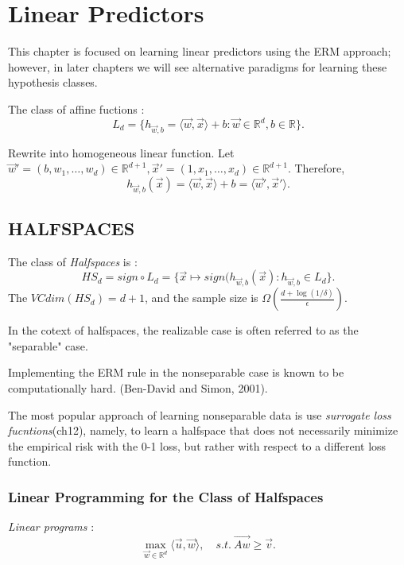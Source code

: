
\section{Linear Predictors}

This chapter is focused on learning linear predictors using the ERM approach; however,
in later chapters we will see alternative paradigms for learning these hypothesis classes.

The class of affine fuctions :
\[
	L_d = \{ h_{\vec{w},b} = \langle \vec{w},\vec{x} \rangle + b
	: \vec{w}\in\mathbb{R}^d, b\in\mathbb{R}\}
.\]

Rewrite into homogeneous linear function.
Let $\vec{w}' = (b, w_1, \dots, w_d) \in \mathbb{R}^{d+1}, 
\vec{x}' = (1, x_1, \dots, x_d) \in \mathbb{R}^{d+1}$. Therefore,
\[
	h_{\vec{w},b}(\vec{x}) = \langle \vec{w},\vec{x}\rangle + b
	= \langle \vec{w}', \vec{x}' \rangle
.\]


\subsection{HALFSPACES}

The class of \emph{Halfspaces} is :
\[
	HS_d = sign \circ L_d = \{ \vec{x}\mapsto sign(h_{\vec{w},b}(\vec{x}) :
	h_{\vec{w},b} \in L_d \}
.\]
The $VCdim(HS_d) = d+1$, and the sample size is 
$\Omega \left( \frac{d+\log(1/\delta)}{\epsilon} \right)$.

In the cotext of halfspaces, the realizable case is often referred to as the "separable" case.

Implementing the ERM rule in the nonseparable case is known to be computationally hard.
(Ben-David and Simon, 2001).

The most popular approach of learning nonseparable data is use 
\emph{surrogate loss fucntions}(ch12),
namely, to learn a halfspace that does not necessarily minimize the empirical risk with
the 0-1 loss, but rather with respect to a different loss function.

\subsubsection{Linear Programming for the Class of Halfspaces}

\emph{Linear programs} : 
\[
	\underset{\vec{w}\in\mathbb{R}^d}{\max} \langle \vec{u},\vec{w} \rangle, 
	\quad s.t.\ \vec{Aw}\ge \vec{v}
.\]

